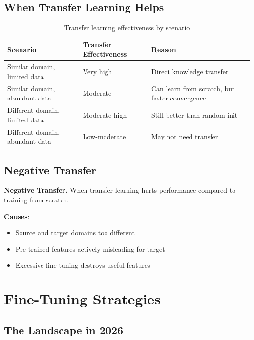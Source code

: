 \subsection{When Transfer Learning Helps}

\begin{table}[H]
\centering
\caption{Transfer learning effectiveness by scenario}
\begin{tabularx}{\textwidth}{lXX}
\toprule
\textbf{Scenario} & \textbf{Transfer Effectiveness} & \textbf{Reason} \\
\midrule
Similar domain, limited data & Very high & Direct knowledge transfer \\
Similar domain, abundant data & Moderate & Can learn from scratch, but faster convergence \\
Different domain, limited data & Moderate-high & Still better than random init \\
Different domain, abundant data & Low-moderate & May not need transfer \\
\bottomrule
\end{tabularx}
\end{table}

\subsection{Negative Transfer}

\textbf{Negative Transfer.} When transfer learning hurts performance compared to training from scratch.

\textbf{Causes}:
\begin{itemize}
    \item Source and target domains too different
    \item Pre-trained features actively misleading for target
    \item Excessive fine-tuning destroys useful features
\end{itemize}

\section{Fine-Tuning Strategies}
\label{sec:finetuning_strategies}

\subsection{The Landscape in 2026}

